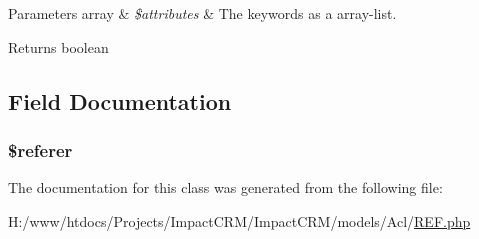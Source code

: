 \begin{DoxyParams}[1]{Parameters}
array & {\em \$attributes} & The keywords as a array-\/list. \\
\hline
\end{DoxyParams}
\begin{DoxyReturn}{Returns}
boolean 
\end{DoxyReturn}


\subsection{Field Documentation}
\hypertarget{classAcl__REF_a872d93ddbbb879ab5c0eb29261a520a4}{
\subsubsection[{\$referer}]{\setlength{\rightskip}{0pt plus 5cm}\$referer}}
\label{classAcl__REF_a872d93ddbbb879ab5c0eb29261a520a4}


The documentation for this class was generated from the following file:\begin{DoxyCompactItemize}
\item 
H:/www/htdocs/Projects/ImpactCRM/ImpactCRM/models/Acl/\hyperlink{REF_8php}{REF.php}\end{DoxyCompactItemize}
